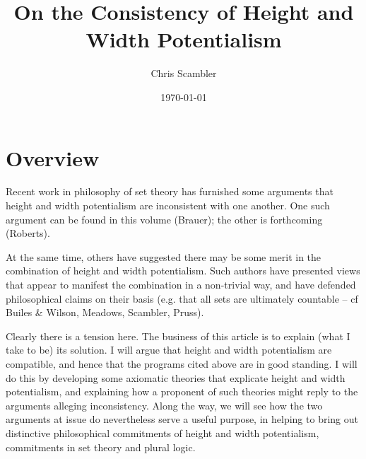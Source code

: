 \documentclass{article}
\title{On the Consistency of Height and Width Potentialism}
\author{Chris Scambler}
\date{\today}
\begin{document}
\maketitle
{}
\section{Overview}
Recent work in philosophy of set theory has furnished 
some arguments that height  and width  potentialism 
are inconsistent with one another. 
One such argument can be found in this volume (Brauer); 
the other is forthcoming (Roberts).

At the same time, others have suggested 
there may be some merit in the combination of 
height  and width  potentialism. Such authors 
have presented views that appear to manifest 
the combination in a non-trivial way, and have 
defended philosophical claims on their basis 
(e.g. that all sets are ultimately countable 
-- cf Builes \& Wilson, Meadows, 
Scambler, Pruss).  

Clearly there is a tension here. 
The business of this article is to explain 
(what I take to be) its solution. 
I will argue that height  and width  potentialism 
are compatible, and hence that the programs 
cited above are in good standing. 
I will do this by developing some 
axiomatic theories that explicate height 
and width potentialism, and explaining how a proponent 
of such theories might reply to the arguments alleging inconsistency.
Along the way, we will see how the two arguments 
at issue do nevertheless serve a useful purpose, 
in helping to bring out distinctive philosophical 
commitments of height and width potentialism,
commitments in 
set theory and plural logic.
\end{document}
